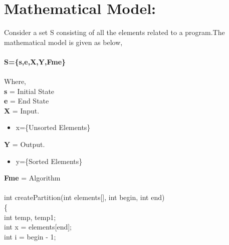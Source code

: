 \documentclass{article}
\begin{document}
	\section{Mathematical Model:}
	Consider a set S consisting of all the elements related to a program.The
	mathematical model is given as below,\\\\
	\textbf{S=\{s,e,X,Y,Fme\} }\\\\
	Where,\\
	\textbf{s} = Initial State\\
	\textbf{e} = End State\\
	\textbf{X} = Input. \\
	\begin{itemize}
		\item  x=\{Unsorted Elements\} 
	\end{itemize}
	\textbf{Y} = Output. \\
	\begin{itemize}
		\item y=\{Sorted Elements\} 
	\end{itemize}
	\textbf{Fme} = Algorithm \\\\
	int createPartition(int elements[], int begin, int end) \\
	\{\\
	int temp, temp1;\\
	int x = elements[end];\\
	int i = begin - 1;\\
\end{document}
